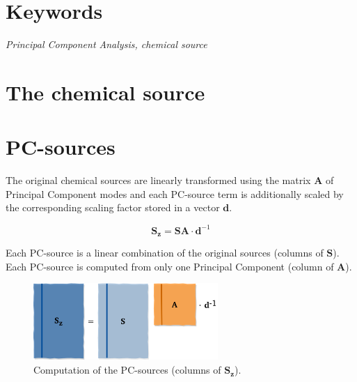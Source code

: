\documentclass[10pt,twocolumn]{article}
\begin{document}
\section*{Keywords}

\textit{Principal Component Analysis, chemical source}



\tableofcontents


\section{The chemical source}




\section{PC-sources}

The original chemical sources are linearly transformed using the matrix $\mathbf{A}$ of Principal Component modes and each PC-source term is additionally scaled by the corresponding scaling factor stored in a vector $\mathbf{d}$.

\begin{equation}
\mathbf{S_z} = \mathbf{S} \mathbf{A} \cdot \mathbf{d}^{-1}
\end{equation}

Each PC-source is a linear combination of the original sources (columns of $\mathbf{S}$). Each PC-source is computed from only one Principal Component (column of $\mathbf{A}$).

\begin{figure}[H]
\centering\includegraphics[width=7cm]{PC-source-computation.png}
\caption{Computation of the PC-sources (columns of $\mathbf{S_z}$).}
\label{fig:PC-source-computation}
\end{figure}



\thebibliography{}

\bibitem{}
\end{document}

